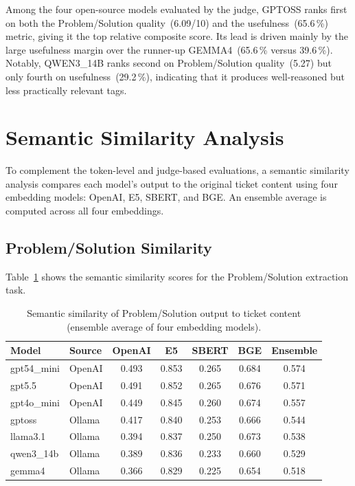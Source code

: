 Among the four open-source models evaluated by the judge, GPTOSS ranks first on
both the Problem/Solution quality~(6.09/10) and the usefulness~(65.6\,\%)
metric, giving it the top relative composite score.  Its lead is driven mainly
by the large usefulness margin over the runner-up GEMMA4~(65.6\,\% versus
39.6\,\%).  Notably, QWEN3\_14B ranks second on Problem/Solution quality~(5.27) but only
fourth on usefulness~(29.2\,\%), indicating that it produces well-reasoned but
less practically relevant tags.

\section{Semantic Similarity Analysis}
\label{sec:res-semantic}
%
To complement the token-level and judge-based evaluations, a semantic
similarity analysis compares each model's output to the original ticket
content using four embedding models: OpenAI, E5, SBERT, and BGE.  An
ensemble average is computed across all four embeddings.

\subsection{Problem/Solution Similarity}
%
Table~\ref{tab:semantic-ps} shows the semantic similarity scores for the
Problem/Solution extraction task.

\begin{table}[H]
    \centering
    \caption[Semantic similarity of Problem/Solution output to ticket content]{Semantic similarity of Problem/Solution output to ticket content
             (ensemble average of four embedding models).}
    \label{tab:semantic-ps}
    \begin{tabular}{llccccc}
        \hline
        \textbf{Model} & \textbf{Source} & \textbf{OpenAI} & \textbf{E5} & \textbf{SBERT} & \textbf{BGE} & \textbf{Ensemble} \\
        \hline
        gpt54\_mini  & OpenAI & 0.493 & 0.853 & 0.265 & 0.684 & 0.574 \\
        gpt5.5       & OpenAI & 0.491 & 0.852 & 0.265 & 0.676 & 0.571 \\
        gpt4o\_mini  & OpenAI & 0.449 & 0.845 & 0.260 & 0.674 & 0.557 \\
        gptoss       & Ollama & 0.417 & 0.840 & 0.253 & 0.666 & 0.544 \\
        llama3.1     & Ollama & 0.394 & 0.837 & 0.250 & 0.673 & 0.538 \\
        qwen3\_14b   & Ollama & 0.389 & 0.836 & 0.233 & 0.660 & 0.529 \\
        gemma4       & Ollama & 0.366 & 0.829 & 0.225 & 0.654 & 0.518 \\
        \hline
    \end{tabular}
\end{table}

